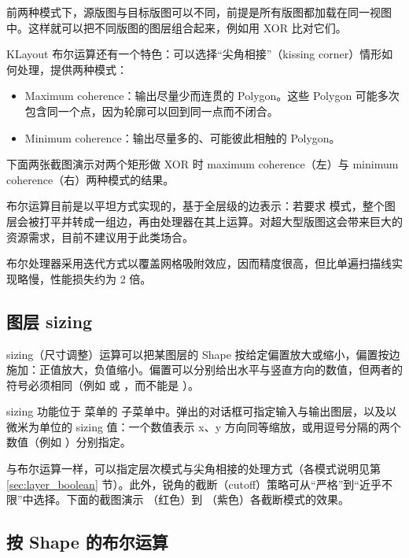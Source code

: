 前两种模式下，源版图与目标版图可以不同，前提是所有版图都加载在同一视图中。这样就可以把不同版图的图层组合起来，例如用 XOR 比对它们。

KLayout 布尔运算还有一个特色：可以选择“尖角相接”（kissing corner）情形如何处理，提供两种模式：

\begin{itemize}
\item Maximum coherence：输出尽量少而连贯的 Polygon。这些 Polygon 可能多次包含同一个点，因为轮廓可以回到同一点而不闭合。
\item Minimum coherence：输出尽量多的、可能彼此相触的 Polygon。
\end{itemize}

下面两张截图演示对两个矩形做 XOR 时 maximum coherence（左）与 minimum coherence（右）两种模式的结果。

布尔运算目前是以平坦方式实现的，基于全层级的边表示：若要求  模式，整个图层会被打平并转成一组边，再由处理器在其上运算。对超大型版图这会带来巨大的资源需求，目前不建议用于此类场合。

布尔处理器采用迭代方式以覆盖网格吸附效应，因而精度很高，但比单遍扫描线实现略慢，性能损失约为 2 倍。

\subsection{图层 sizing}\label{sec:layer_size}

sizing（尺寸调整）运算可以把某图层的 Shape 按给定偏置放大或缩小，偏置按边施加：正值放大，负值缩小。偏置可以分别给出水平与竖直方向的数值，但两者的符号必须相同（例如  或 ，而不能是 ）。

sizing 功能位于  菜单的  子菜单中。弹出的对话框可指定输入与输出图层，以及以微米为单位的 sizing 值：一个数值表示 x、y 方向同等缩放，或用逗号分隔的两个数值（例如 ）分别指定。

与布尔运算一样，可以指定层次模式与尖角相接的处理方式（各模式说明见第 \ref{sec:layer_boolean} 节）。此外，锐角的截断（cutoff）策略可从“严格”到“近乎不限”中选择。下面的截图演示 （红色）到 （紫色）各截断模式的效果。


\subsection{按 Shape 的布尔运算}\label{sec:shape_boolean}

